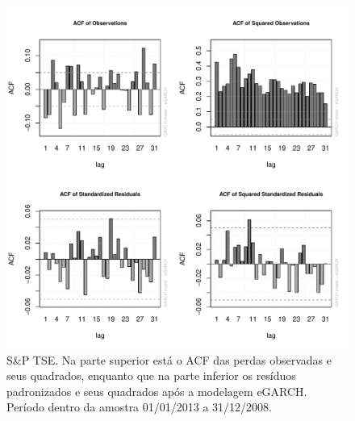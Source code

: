 \documentclass[1p]{elsarticle}
\theoremstyle{definition}
\begin{document}
\begin{figure}[H]
	\centering
	\includegraphics[width=1\linewidth]{figs/artigo-acf-SP-TSE}
	\caption{S\&P TSE. Na parte superior está o ACF das perdas observadas e seus quadrados, enquanto que na parte inferior os resíduos padronizados e seus quadrados após a modelagem eGARCH. Período dentro da amostra 01/01/2013 a 31/12/2008.}
	\label{fig:artigo-acf-sptse}
\end{figure}
\end{document}

